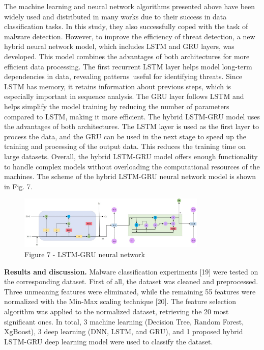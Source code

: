 The machine learning and neural network algorithms presented above have
been widely used and distributed in many works due to their success in
data classification tasks. In this study, they also successfully coped
with the task of malware detection. However, to improve the efficiency
of threat detection, a new hybrid neural network model, which includes
LSTM and GRU layers, was developed. This model combines the advantages
of both architectures for more efficient data processing. The first
recurrent LSTM layer helps model long-term dependencies in data,
revealing patterns~useful for identifying threats. Since LSTM has
memory, it retains information about previous steps, which is especially
important in sequence analysis. The GRU layer follows LSTM and helps
simplify the model training by reducing the number of parameters
compared to LSTM, making it more efficient. The hybrid LSTM-GRU model
uses the advantages of both architectures. The LSTM layer is used as the
first layer to process the data, and the GRU can be used in the next
stage to speed up the training and processing of the output data. This
reduces the training time on large datasets. Overall, the hybrid
LSTM-GRU model offers enough functionality to handle complex models
without overloading the computational resources of the machines. The
scheme of the hybrid LSTM-GRU neural network model is shown in Fig. 7.

\begin{figure}[H]
	\centering
	\includegraphics[width=0.8\textwidth]{media/ict/image80}
	\caption*{Figure 7 - LSTM-GRU neural network}
\end{figure}

{\bfseries Results and discussion.} Malware classification experiments
{[}19{]} were tested on the corresponding dataset. First of all, the
dataset was cleaned and preprocessed. Three unmeaning features were
eliminated, while the remaining 55 features were normalized with the
Min-Max scaling technique {[}20{]}. The feature selection algorithm was
applied to the normalized dataset, retrieving the 20 most significant
ones. In total, 3 machine learning (Decision Tree, Random Forest,
XgBoost), 3 deep learning (DNN, LSTM, and GRU), and 1 proposed hybrid
LSTM-GRU deep learning model were used to classify the dataset.

